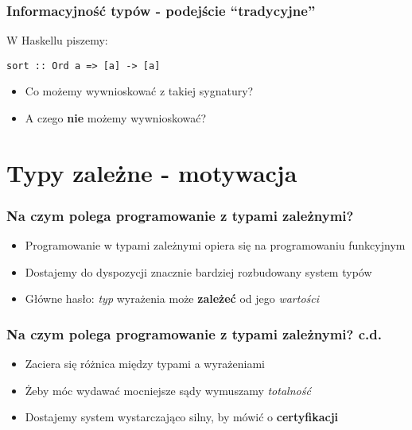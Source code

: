 \documentclass{beamer}
\begin{document}
\begin{frame}[fragile]
\frametitle{Informacyjność typów - podejście ``tradycyjne''}

W Haskellu piszemy:

\begin{lstlisting}
sort :: Ord a => [a] -> [a]
\end{lstlisting}

\begin{itemize}
\item Co możemy wywnioskować z takiej sygnatury? 
\item A czego {\bf nie} możemy wywnioskować?
\end{itemize}


\end{frame}


\section{Typy zależne - motywacja}

\begin{frame}
\frametitle{Na czym polega programowanie z typami zależnymi?}

\begin{itemize}

\item Programowanie w typami zależnymi opiera się na programowaniu funkcyjnym
\item Dostajemy do dyspozycji znacznie bardziej rozbudowany system typów
\item Główne hasło: \emph{typ} wyrażenia może {\bf zależeć} od jego \emph{wartości}

\end{itemize}

\end{frame}


\begin{frame}
\frametitle{Na czym polega programowanie z typami zależnymi? c.d.}

\begin{itemize}

\item Zaciera się różnica między typami a wyrażeniami
\item Żeby móc wydawać mocniejsze sądy wymuszamy \emph{totalność}
\item Dostajemy system wystarczająco silny, by mówić o {\bf certyfikacji}

\end{itemize}

\end{frame}
\end{document}
